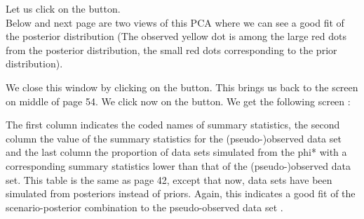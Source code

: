 {%

Let us click on the  button.\\

Below and next page are two views of this PCA where we can see a good fit of the posterior distribution (The observed yellow dot is among the large red dots from the posterior distribution, the small red dots corresponding to the prior distribution). \\



\newpage

We close this window by clicking on the  button. This brings us back to the  screen on middle of page 54. We click now on the   button. We get the following screen :



The first column indicates the coded names of summary statistics, the second column the value of the summary statistics for the (pseudo-)observed data set and the last column the proportion of data sets simulated from the phi* with a corresponding summary statistics lower than that of the (pseudo-)observed data set. This table is the same as page 42, except that now, data sets have been simulated from posteriors instead of priors. Again, this indicates a good fit of the scenario-posterior combination to the pseudo-observed data set \citep[see][for additional insights on model checking in an ABC framework]{C2010}.\\

}
